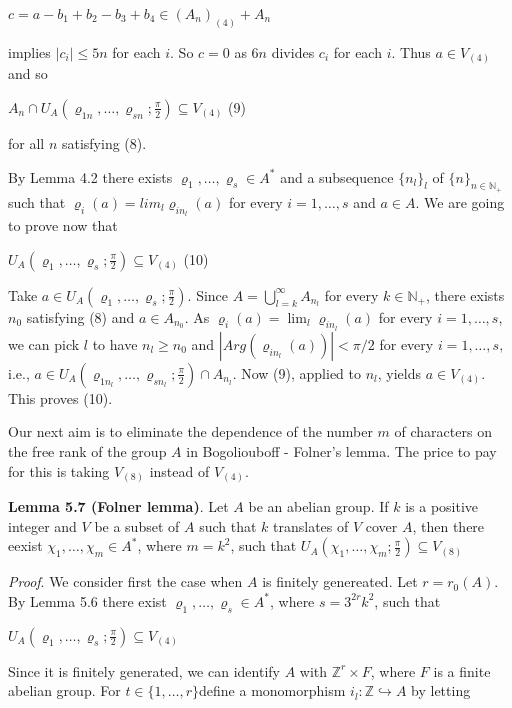 \documentclass[12pt]{article}
\begin{document}
    $c = a - b_1 + b_2 - b_3 + b_4 \in (A_n)_{(4)} + A_n$


implies $|c_i| \leq 5n$ for each $i$. So $c = 0$ as $6n$ divides $c_i$ for each $i$. Thus $a \in V_{(4)}$ and so


    $A_n \cap U_A (\varrho_{1n}, \dots, \varrho_{sn}; \frac{\pi}{2}) \subseteq V_{(4)}$  (9)


for all $n$ satisfying (8).


    By Lemma 4.2 there exists $\varrho_1, \dots, \varrho_s \in A^*$ and a subsequence $\{n_l\}_l$ of $\{n\}_{n \in \mathbb{N}_+}$ such that $\varrho_i (a) = lim_l \varrho_{in_l} (a)$
for every $i = 1, \dots, s$ and $a \in A$. We are going to prove now that


    $U_A (\varrho_1, \dots, \varrho_s; \frac{\pi}{2}) \subseteq V_{(4)}$  (10)


    Take $a \in U_A (\varrho_1, \dots, \varrho_s; \frac{\pi}{2})$. Since $A = \bigcup^{\infty}_{l=k}A_{n_l}$ for every $k \in \mathbb{N}_+$, there exists $n_0$ satisfying (8) and $a \in A_{n_0}$. 
As $\varrho_i(a) = \lim_l \varrho_{in_l}(a)$ for every $i = 1, \dots, s$, we can pick $l$ to have $n_l \geq n_0$ and $|Arg(\varrho_{in_l} (a))| < \pi/2$ for every
$i = 1, \dots, s,$ i.e., $a \in U_A (\varrho_{1n_l}, \dots, \varrho_{sn_l}; \frac{\pi}{2}) \cap A_{n_l}$. Now (9), applied to $n_l$, yields $a \in V_{(4)}$. This proves (10).


    Our next aim is to eliminate the dependence of the number $m$ of characters on the free rank of the group $A$
in Bogoliouboff - Folner's lemma. The price to pay for this is taking $V_{(8)}$ instead of $V_(4)$.


\textbf{Lemma 5.7 (Folner lemma)}. Let $A$ be an abelian group. If $k$ is a positive integer and $V$ be a subset of $A$ such
that $k$ translates of $V$ cover $A$, then there eexist $\chi_1, \dots, \chi_m \in A^*$, where $m = k^2$, such that $U_A (\chi_1, \dots, \chi_m; \frac{\pi}{2}) \subseteq V_{(8)}$ 


\emph{Proof}. We consider first the case when $A$ is finitely genereated. Let $r = r_0 (A)$. By Lemma 5.6 there exist 
$\varrho_1, \dots, \varrho_s \in A^*$, where $s = 3^{2r}k^2$, such that


    $U_A (\varrho_1, \dots, \varrho_s; \frac{\pi}{2}) \subseteq V_{(4)}$ 



    Since it is finitely generated, we can identify $A$ with $\mathbb{Z}^r \times F$, where $F$ is a finite abelian group. For $t \in \{1, \dots, r\}$define
a monomorphism $i_l : \mathbb{Z} \hookrightarrow A$ by letting
\end{document}
